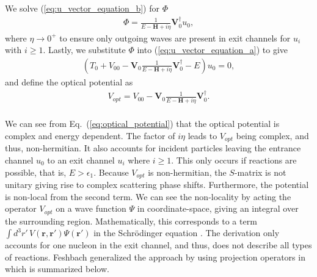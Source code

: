 \documentclass[preprintnumbers,floatfix,aps,prc,preprint,nofootinbib]{revtex4-1}
\begin{document}
%
We solve (\ref{eq:u_vector_equation_b}) for $\Phi$
%
\begin{eqnarray}
	\label{eq:phi}
	\Phi = \frac{1}{E - \textbf{H} + i \eta} \textbf{V}_0^{\dagger} u_0,
\end{eqnarray}
%
where $\eta \rightarrow 0^+$ to ensure only outgoing waves are present in exit channels for $u_i$ with $i \geq 1$. Lastly, we substitute $\Phi$ into (\ref{eq:u_vector_equation_a}) to give
%
\begin{eqnarray}
	\label{eq:u0_equation}
	(T_0 + V_{00}  - \textbf{V}_0 \frac{1}{E-\textbf{H}+i\eta} \textbf{V}_0^{\dagger} - E) u_0 = 0,
\end{eqnarray}
%
and define the optical potential as
%
\begin{eqnarray}
	\label{eq:optical_potential}
	V_{opt} = V_{00}  - \textbf{V}_0 \frac{1}{E-\textbf{H}+i\eta} \textbf{V}_0^{\dagger}.
\end{eqnarray}
%
\\

We can see from Eq.~(\ref{eq:optical_potential}) that the optical potential is complex and energy dependent. The factor of $i \eta$ leads to $V_{opt}$ being complex, and thus, non-hermitian. It also accounts for incident particles leaving the entrance channel $u_0$ to an exit channel $u_i$ where $i \geq 1$. This only occurs if reactions are possible, that is, $E > \epsilon_1$. Because $V_{opt}$ is non-hermitian, the $S$-matrix is not unitary giving rise to complex scattering phase shifts. Furthermore, the potential is non-local from the second term. We can see the non-locality by acting the operator $V_{opt}$ on a wave function $\Psi$ in coordinate-space, giving an integral over the surrounding region. Mathematically, this corresponds to a term $\int d^3 r' \, V(\textbf{r}, \textbf{r}') \Psi(\textbf{r}')$ in the Schr\"odinger equation \cite{Hodgson:1971ab}. The derivation only accounts for one nucleon in the exit channel, and thus, does not describe all types of reactions. Feshbach generalized the approach by using projection operators in \cite{Feshbach:1962ut} which is summarized below.
\\
\end{document}
